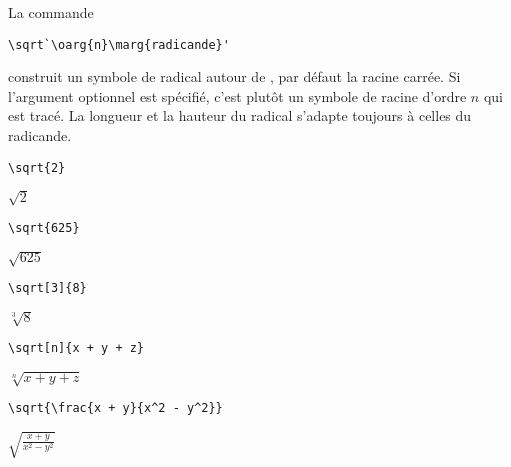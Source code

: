 La commande
\begin{lstlisting}
\sqrt`\oarg{n}\marg{radicande}'
\end{lstlisting}
construit un symbole de radical autour de , par défaut
la racine carrée. Si l'argument optionnel  est spécifié, c'est
plutôt un symbole de racine d'ordre $n$ qui est tracé. La longueur et
la hauteur du radical s'adapte toujours à celles du radicande.
\begin{demo}
\item
  \begin{texinput}{0.2\linewidth}
\begin{lstlisting}
\sqrt{2}
\end{lstlisting}
  \end{texinput}
  \quad
  \begin{texoutput}{0.1\linewidth}
    $\sqrt{2}$
  \end{texoutput}
  \hfill
  \begin{texinput}{0.2\linewidth}
\begin{lstlisting}
\sqrt{625}
\end{lstlisting}
  \end{texinput}
  \quad
  \begin{texoutput}{0.1\linewidth}
    $\sqrt{625}$
  \end{texoutput}
  \hfill
  \begin{texinput}{0.2\linewidth}
\begin{lstlisting}
\sqrt[3]{8}
\end{lstlisting}
  \end{texinput}
  \quad
  \begin{texoutput}{0.1\linewidth}
    $\sqrt[3]{8}$
  \end{texoutput}
\item
  \begin{texinput}{0.48\linewidth}
\begin{lstlisting}
\sqrt[n]{x + y + z}
\end{lstlisting}
  \end{texinput}
  \hfill
  \begin{texoutput}{0.48\linewidth}
    $\sqrt[n]{x + y + z}$
  \end{texoutput}
\item
  \begin{texinput}{0.48\linewidth}
\begin{lstlisting}
\sqrt{\frac{x + y}{x^2 - y^2}}
\end{lstlisting}
  \end{texinput}
  \hfill
  \begin{texoutput}[c]{0.48\linewidth}
    $\displaystyle \sqrt{\frac{x + y}{x^2 - y^2}}$
  \end{texoutput}
\end{demo}

